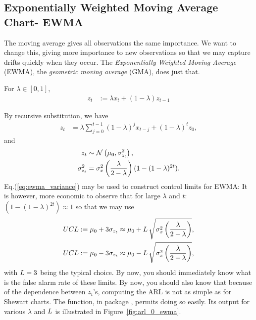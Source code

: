 \subsection{Exponentially Weighted Moving Average Chart- EWMA}
The moving average gives all observations the same importance. 
We want to change this, giving more importance to new observations so that we may capture drifts quickly when they occur. 
The \emph{Exponentially Weighted Moving Average} (EWMA), \aka the \emph{geometric moving average} (GMA), does just that. 
\begin{definition}
For $\lambda \in [0,1]$,
\begin{align}
	z_t &:= \lambda x_t + (1-\lambda) z_{t-1}
\end{align}
\end{definition}
By recursive substitution, we have 
\begin{align}
	z_t &= \lambda \sum_{j=0}^{t-1} (1-\lambda)^j x_{t-j} + (1-\lambda)^t z_0,
\end{align}
and 
\begin{align}
\label{eq:ewma_variance}
	z_t &\sim \mathcal{N}\left(\mu_0,	\sigma^2_{z_t} \right), \\
	\sigma^2_{z_t} &= \sigma^2_x \left( \frac{\lambda}{2-\lambda} \right)(1-(1-\lambda)^{2t}).
\end{align}
Eq.(\ref{eq:ewma_variance}) may be used to construct control limits for EWMA:
It is however, more economic to observe that for large $\lambda$ and $t$: $(1-(1-\lambda)^{2t}) \approx 1$ so that we may use 
\begin{align}
\begin{split}
\label{eq:ewma_variance_approximate}
	UCL &:= \mu_0 + 3 \sigma_{z_t} \approx \mu_0 + L \, \sqrt{\sigma^2_x\left( \frac{\lambda}{2-\lambda} \right)},  \\
	UCL &:= \mu_0 - 3 \sigma_{z_t} \approx \mu_0 - L \, \sqrt{\sigma^2_x\left( \frac{\lambda}{2-\lambda} \right)},
\end{split}
\end{align}
with $L=3$ being the typical choice.
By now, you should immediately know what is the false alarm rate of these limits.
By now, you should also know that because of the dependence between $z_t$'s, computing the ARL is not as simple as for Shewart charts. The  \R function, in package , permits doing so easily. 
Its output for various $\lambda$ and $L$ is illustrated in Figure~\ref{fig:arl_0_ewma}.

